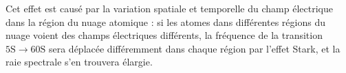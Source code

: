 Cet effet est causé par la variation spatiale et temporelle du champ électrique dans la région du nuage atomique :
si les atomes dans différentes régions du nuage voient des champs électriques différents, la fréquence de la transition $\mathrm{5S}\rightarrow\mathrm{60S}$ sera déplacée différemment dans chaque région par l'effet Stark, et la raie spectrale s'en trouvera élargie.
%
%
%
